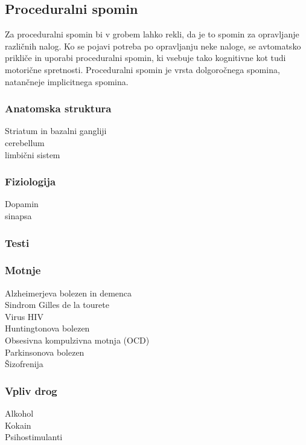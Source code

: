 \documentclass[10pt,a4paper]{article}
\begin{document}
\subsection{Proceduralni spomin}
Za proceduralni spomin bi v grobem lahko rekli, da je to spomin za opravljanje različnih nalog. Ko se pojavi potreba po opravljanju neke naloge, se avtomatsko prikliče in uporabi proceduralni spomin, ki vsebuje tako kognitivne kot tudi motorične spretnosti. Proceduralni spomin je vrsta dolgoročnega spomina, natančneje implicitnega spomina.

\subsubsection{Anatomska struktura}
Striatum in bazalni gangliji\\
cerebellum\\
limbični sistem

\subsubsection{Fiziologija}
Dopamin\\
sinapsa

\subsubsection{Testi}

\subsubsection{Motnje}
Alzheimerjeva bolezen in demenca\\
Sindrom Gilles de la tourete\\
Virus HIV\\
Huntingtonova bolezen\\
Obsesivna kompulzivna motnja (OCD)\\
Parkinsonova bolezen\\
Šizofrenija

\subsubsection{Vpliv drog}
Alkohol\\
Kokain\\
Psihostimulanti

\section{}
\end{document}
